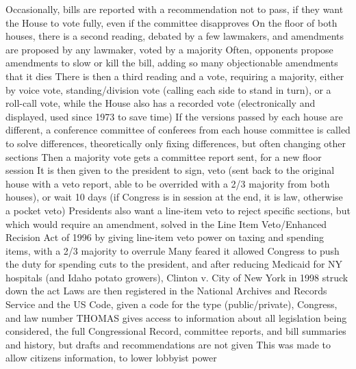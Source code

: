 \documentclass[11 pt, twoside]{article}
\newenvironment{outline*}
{
	\begin{outline}[enumerate]
	}
	{\end{outline}
}
\begin{document}
\begin{outline*}
\2 Occasionally, bills are reported with a recommendation not to pass, if they want the House to vote fully, even if the committee disapproves
\1 On the floor of both houses, there is a second reading, debated by a few lawmakers, and amendments are proposed by any lawmaker, voted by a majority
\2 Often, opponents propose amendments to slow or kill the bill, adding so many objectionable amendments that it dies
\2 There is then a third reading and a vote, requiring a majority, either by voice vote, standing/division vote (calling each side to stand in turn), or a roll-call vote, while the House also has a recorded vote (electronically and displayed, used since 1973 to save time)
\1 If the versions passed by each house are different, a conference committee of conferees from each house committee is called to solve differences, theoretically only fixing differences, but often changing other sections
\2 Then a majority vote gets a committee report sent, for a new floor session
\1 It is then given to the president to sign, veto (sent back to the original house with a veto report, able to be overrided with a 2/3 majority from both houses), or wait 10 days (if Congress is in session at the end, it is law, otherwise a pocket veto)
\2 Presidents also want a line-item veto to reject specific sections, but which would require an amendment, solved in the Line Item Veto/Enhanced Recision Act of 1996 by giving line-item veto power on taxing and spending items, with a 2/3 majority to overrule
\2 Many feared it allowed Congress to push the duty for spending cuts to the president, and after reducing Medicaid for NY hospitals (and Idaho potato growers), Clinton v. City of New York in 1998 struck down the act
\1 Laws are then registered in the National Archives and Records Service and the US Code, given a code for the type (public/private), Congress, and law number
\2 THOMAS gives access to information about all legislation being considered, the full Congressional Record, committee reports, and bill summaries and history, but drafts and recommendations are not given
\2 This was made to allow citizens information, to lower lobbyist power
\end{outline*}
\end{document}
